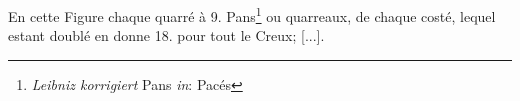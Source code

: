 \pend \pstart [p.~82] En cette Figure chaque quarr\'{e} \`{a} 9. Pans\footnote{\textit{Leibniz korrigiert} Pans \textit{in}: Pac\'{e}s} ou quarreaux, de chaque cost\'{e}, lequel estant doubl\'{e} en donne 18. pour tout le Creux; [...].